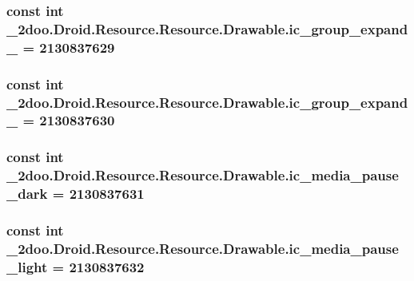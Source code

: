 \hypertarget{class__2doo_1_1_droid_1_1_resource_1_1_drawable_c49eedf6da9cf69145af867225df8614}{
\subsubsection[{ic\_\-group\_\-expand\_\-14}]{\setlength{\rightskip}{0pt plus 5cm}const int \_\-2doo.Droid.Resource.Resource.Drawable.ic\_\-group\_\-expand\_ = 2130837629}}
\label{class__2doo_1_1_droid_1_1_resource_1_1_drawable_c49eedf6da9cf69145af867225df8614}


\hypertarget{class__2doo_1_1_droid_1_1_resource_1_1_drawable_e47703f7757d5b145d46ae4a11abef71}{
\subsubsection[{ic\_\-group\_\-expand\_\-15}]{\setlength{\rightskip}{0pt plus 5cm}const int \_\-2doo.Droid.Resource.Resource.Drawable.ic\_\-group\_\-expand\_ = 2130837630}}
\label{class__2doo_1_1_droid_1_1_resource_1_1_drawable_e47703f7757d5b145d46ae4a11abef71}


\hypertarget{class__2doo_1_1_droid_1_1_resource_1_1_drawable_1b208ac9e9478d8363752ce25385f2b9}{
\subsubsection[{ic\_\-media\_\-pause\_\-dark}]{\setlength{\rightskip}{0pt plus 5cm}const int \_\-2doo.Droid.Resource.Resource.Drawable.ic\_\-media\_\-pause\_\-dark = 2130837631}}
\label{class__2doo_1_1_droid_1_1_resource_1_1_drawable_1b208ac9e9478d8363752ce25385f2b9}


\hypertarget{class__2doo_1_1_droid_1_1_resource_1_1_drawable_8607acd675372c028e44264cf9f2f7e8}{
\subsubsection[{ic\_\-media\_\-pause\_\-light}]{\setlength{\rightskip}{0pt plus 5cm}const int \_\-2doo.Droid.Resource.Resource.Drawable.ic\_\-media\_\-pause\_\-light = 2130837632}}
\label{class__2doo_1_1_droid_1_1_resource_1_1_drawable_8607acd675372c028e44264cf9f2f7e8}


